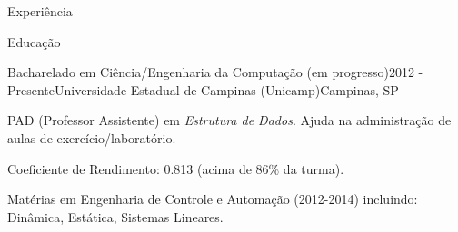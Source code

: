 \documentclass[8pt]{resume}
\newcommand{\tit}[1]{\textit{#1}}
\begin{document}
\begin{rSection}{Experiência}

\end{rSection}

\begin{rSection}{Educação}

    \begin{rSubsection}{Bacharelado em Ciência/Engenharia da Computação (em progresso)}{2012 - Presente}{Universidade Estadual de Campinas (Unicamp)}{Campinas, SP}
    \item PAD (Professor Assistente) em \tit{Estrutura de Dados}. Ajuda
        na administração de aulas de exercício/laboratório.
    \item Coeficiente de Rendimento: 0.813 (acima de 86\% da turma).
    \item Matérias em Engenharia de Controle e Automação (2012-2014) incluindo:
        Dinâmica, Estática, Sistemas Lineares.
\end{rSubsection}

\end{rSection}
\end{document}
